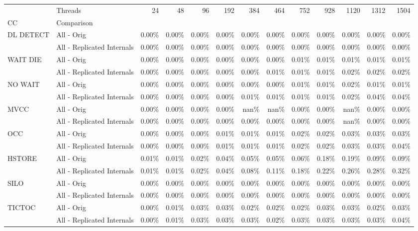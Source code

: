 \begin{tabular}{llrrrrrrrrrrr}
\toprule
       & Threads &  24   &  48   &  96   &  192  &  384  &  464  &  752  &  928  &  1120 &  1312 &  1504 \\
CC & Comparison &       &       &       &       &       &       &       &       &       &       &       \\
\midrule
DL DETECT & All - Orig & 0.00\% & 0.00\% & 0.00\% & 0.00\% & 0.00\% & 0.00\% & 0.00\% & 0.00\% & 0.00\% & 0.00\% & 0.00\% \\
       & All - Replicated Internals & 0.00\% & 0.00\% & 0.00\% & 0.00\% & 0.00\% & 0.00\% & 0.00\% & 0.00\% & 0.00\% & 0.00\% & 0.00\% \\
WAIT DIE & All - Orig & 0.00\% & 0.00\% & 0.00\% & 0.00\% & 0.00\% & 0.00\% & 0.01\% & 0.01\% & 0.01\% & 0.01\% & 0.01\% \\
       & All - Replicated Internals & 0.00\% & 0.00\% & 0.00\% & 0.00\% & 0.00\% & 0.01\% & 0.01\% & 0.01\% & 0.02\% & 0.02\% & 0.02\% \\
NO WAIT & All - Orig & 0.00\% & 0.00\% & 0.00\% & 0.00\% & 0.00\% & 0.00\% & 0.01\% & 0.01\% & 0.02\% & 0.01\% & 0.01\% \\
       & All - Replicated Internals & 0.00\% & 0.00\% & 0.00\% & 0.00\% & 0.01\% & 0.01\% & 0.01\% & 0.01\% & 0.02\% & 0.04\% & 0.04\% \\
MVCC & All - Orig & 0.00\% & 0.00\% & 0.00\% & 0.00\% &  nan\% &  nan\% & 0.00\% & 0.00\% &  nan\% & 0.00\% & 0.00\% \\
       & All - Replicated Internals & 0.00\% & 0.00\% & 0.00\% & 0.00\% & 0.00\% & 0.00\% & 0.00\% & 0.00\% &  nan\% & 0.00\% & 0.00\% \\
OCC & All - Orig & 0.00\% & 0.00\% & 0.00\% & 0.01\% & 0.01\% & 0.01\% & 0.02\% & 0.02\% & 0.03\% & 0.03\% & 0.03\% \\
       & All - Replicated Internals & 0.00\% & 0.00\% & 0.00\% & 0.01\% & 0.01\% & 0.01\% & 0.02\% & 0.02\% & 0.03\% & 0.03\% & 0.04\% \\
HSTORE & All - Orig & 0.01\% & 0.01\% & 0.02\% & 0.04\% & 0.05\% & 0.05\% & 0.06\% & 0.18\% & 0.19\% & 0.09\% & 0.09\% \\
       & All - Replicated Internals & 0.01\% & 0.01\% & 0.02\% & 0.04\% & 0.08\% & 0.11\% & 0.18\% & 0.22\% & 0.26\% & 0.28\% & 0.32\% \\
SILO & All - Orig & 0.00\% & 0.00\% & 0.00\% & 0.00\% & 0.00\% & 0.00\% & 0.00\% & 0.00\% & 0.00\% & 0.00\% & 0.00\% \\
       & All - Replicated Internals & 0.00\% & 0.00\% & 0.00\% & 0.00\% & 0.00\% & 0.00\% & 0.00\% & 0.00\% & 0.00\% & 0.00\% & 0.00\% \\
TICTOC & All - Orig & 0.00\% & 0.01\% & 0.03\% & 0.03\% & 0.02\% & 0.02\% & 0.02\% & 0.03\% & 0.03\% & 0.02\% & 0.03\% \\
       & All - Replicated Internals & 0.00\% & 0.01\% & 0.03\% & 0.03\% & 0.03\% & 0.02\% & 0.03\% & 0.03\% & 0.03\% & 0.03\% & 0.04\% \\
\bottomrule
\end{tabular}
